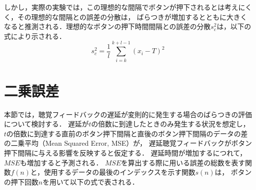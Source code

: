 \documentclass{article} %
\begin{document}
しかし，実際の実験では，この理想的な間隔でボタンが押下されるとは考えにくく，その理想的な間隔との誤差の分散は，
ばらつきが増加するとともに大きくなると推測される．理想的なボタンの押下時間間隔との誤差の分散$s^2_{c}$は，以下の式により示される．
\begin{equation}
  s^2_c = \frac{1}{l} \sum_{i=k}^{k+l-1} (x_i - T)^2
\end{equation}
\section{二乗誤差}
本節では，聴覚フィードバックの遅延が変則的に発生する場合のばらつきの評価について検討する．
遅延が$t$の倍数に到達したときのみ発生する状況を想定し，$t$の倍数に到達する直前のボタン押下間隔と直後のボタン押下間隔のデータの差の二乗平均（Mean Squared Error, MSE）が，
遅延聴覚フィードバックがボタン押下間隔に与える影響を反映すると仮定する．
遅延時間が増加するにつれて，$MSE$も増加すると予測される．
$MSE$を算出する際に用いる誤差の総数を表す関数$f(n)$と，使用するデータの最後のインデックスを示す関数$s(n)$は，
ボタンの押下回数$n$を用いて以下の式で表される．
\end{document}
